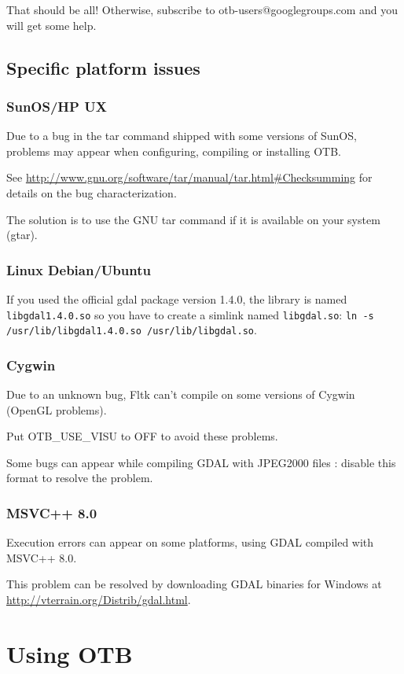 That should be all! Otherwise, subscribe to
   otb-users@googlegroups.com and you will get some help.

\subsection{Specific platform issues}
\subsubsection{SunOS/HP UX}
Due to a bug in the tar command shipped with some versions of SunOS,
problems may appear when configuring, compiling or installing OTB.

See \url{http://www.gnu.org/software/tar/manual/tar.html#Checksumming} for
details on the bug characterization.

The solution is to use the GNU tar command if it is available on your
system (gtar).

\subsubsection{Linux Debian/Ubuntu}
If you used the official gdal package version 1.4.0, the library is named 
\texttt{libgdal1.4.0.so} so you have to create a simlink named 
\texttt{libgdal.so}: \texttt{ln -s /usr/lib/libgdal1.4.0.so /usr/lib/libgdal.so}.

\subsubsection{Cygwin}
Due to an unknown bug, Fltk can't compile on some versions of Cygwin (OpenGL problems).

Put OTB\_USE\_VISU to OFF to avoid these problems.

Some bugs can appear while compiling GDAL with JPEG2000 files : disable this format to resolve the problem.

\subsubsection{MSVC++ 8.0}
Execution errors can appear on some platforms, using GDAL compiled with MSVC++ 8.0.

This problem can be resolved by downloading GDAL binaries for Windows
at \url{http://vterrain.org/Distrib/gdal.html}.

\section{Using OTB}

